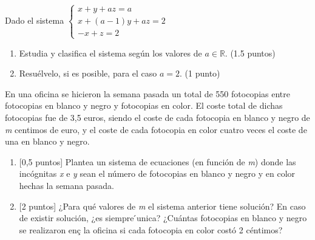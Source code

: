 \documentclass[
]{article}
\providecommand{\tightlist}{%
  \setlength{\itemsep}{0pt}\setlength{\parskip}{0pt}}
\begin{document}
\begin{exercise} Dado el sistema
\(\begin{cases} x + y + az = a\\ x + (a-1)y + az = 2\\ -x + z = 2 \end{cases}\)

\begin{enumerate}
\def\labelenumi{\alph{enumi})}
\tightlist
\item
  Estudia y clasifica el sistema según los valores de
  \(a \in \mathbb{R}\). (1.5 puntos)
\item
  Resuélvelo, si es posible, para el caso \(a = 2\). (1 punto)
\end{enumerate}

\end{exercise}

\begin{exercise} En una oficina se hicieron la semana pasada un total de
550 fotocopias entre fotocopias en blanco y negro y fotocopias en color.
El coste total de dichas fotocopias fue de 3,5 euros, siendo el coste de
cada fotocopia en blanco y negro de \emph{m} centimos de euro, y el
coste de cada fotocopia en color cuatro veces el coste de una en blanco
y negro.

\begin{enumerate}
\def\labelenumi{\alph{enumi})}
\tightlist
\item
  {[}0,5 puntos{]} Plantea un sistema de ecuaciones (en función de
  \emph{m}) donde las incógnitas \emph{x} e \emph{y} sean el número de
  fotocopias en blanco y negro y en color hechas la semana pasada.
\item
  {[}2 puntos{]} ¿Para qué valores de \emph{m} el sistema anterior tiene
  solución? En caso de existir solución, ¿es siempre ́unica? ¿Cuántas
  fotocopias en blanco y negro se realizaron enç la oficina si cada
  fotocopia en color costó 2 céntimos?
\end{enumerate}

\end{exercise}
\end{document}
